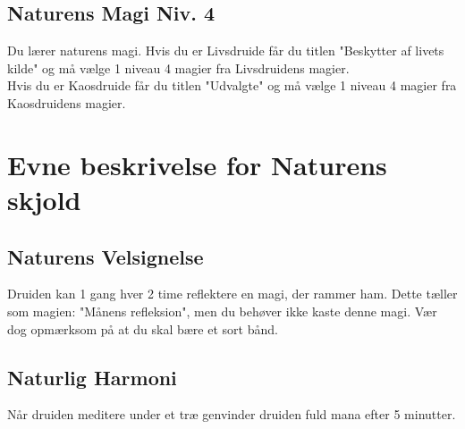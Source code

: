 \subsection*{Naturens Magi Niv. 4}
Du lærer naturens magi. Hvis du er Livsdruide får du titlen "Beskytter af livets kilde" og må vælge 1 niveau 4 magier fra Livsdruidens magier.\\ Hvis du er Kaosdruide får du titlen "Udvalgte" og må vælge 1 niveau 4 magier fra Kaosdruidens magier.\\

\section*{Evne beskrivelse for Naturens skjold}



\subsection*{Naturens Velsignelse}
Druiden kan 1 gang hver 2 time reflektere en magi, der rammer ham. Dette tæller som magien: "Månens refleksion", men du behøver ikke kaste denne magi. Vær dog opmærksom på at du skal bære et sort bånd.

\subsection*{Naturlig Harmoni}
Når druiden meditere under et træ genvinder druiden fuld mana efter 5 minutter.